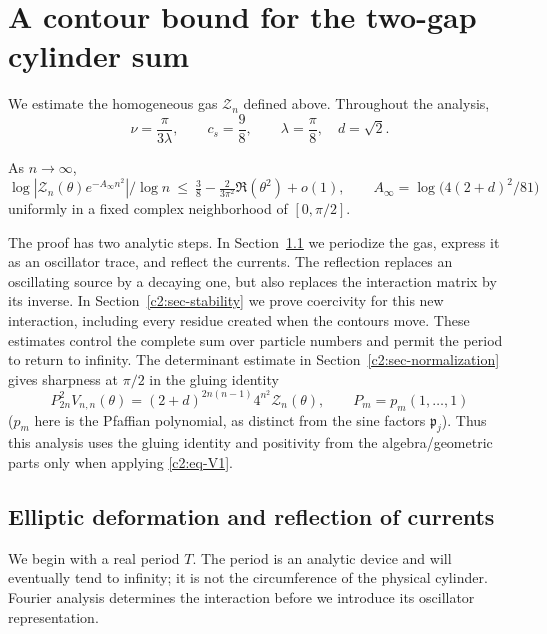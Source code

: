 \section{A contour bound for the two-gap cylinder sum}
\label{c2:sec-contour}

We estimate the homogeneous gas \(\mathcal Z_n\) defined above. Throughout the analysis,
\[
 \nu=\frac{\pi}{3\lambda},\qquad c_s=\frac98,
 \qquad \lambda=\frac\pi8,\quad d=\sqrt2.
\]
\begin{theorem}
\label{c2:thm-contour-bound}
As \(n\to\infty\),
\begin{equation}
 \log|\mathcal Z_n(\theta)e^{-A_\infty n^2}|/\log n
 \ \le\ \tfrac38-\tfrac{2}{3\pi^2}\Re(\theta^2)+o(1),\qquad
 A_\infty=\log\!\big(4(2+d)^2/81\big)                                     \label{c2:eq-V1}
\end{equation}
uniformly in a fixed complex neighborhood of \([0,\pi/2]\).
\end{theorem}

The proof has two analytic steps. In Section~\ref{c2:sec-currents} we
periodize the gas, express it as an oscillator trace, and reflect the
currents. The reflection replaces an oscillating source by a decaying one,
but also replaces the interaction matrix by its inverse. In
Section~\ref{c2:sec-stability} we prove coercivity for this new interaction,
including every residue created when the contours move. These estimates
control the complete sum over particle numbers and permit the period to
return to infinity. The determinant estimate in Section~\ref{c2:sec-normalization} gives sharpness at \(\pi/2\) in the gluing identity
\[
 P_{2n}^2 V_{n,n}(\theta)=(2+d)^{2n(n-1)}4^{n^2}\mathcal Z_n(\theta),
 \qquad P_m=p_m(1,\ldots,1)
\]
(\(p_m\) here is the Pfaffian polynomial, as distinct from the sine factors \(\mathfrak p_j\)). Thus this analysis uses the gluing identity and positivity from the algebra/geometric parts only when applying \eqref{c2:eq-V1}.

\subsection{Elliptic deformation and reflection of currents}
\label{c2:sec-currents}

We begin with a real period \(T\). The period is an analytic device and
will eventually tend to infinity; it is not the circumference of the
physical cylinder. Fourier analysis determines the interaction before we
introduce its oscillator representation.

